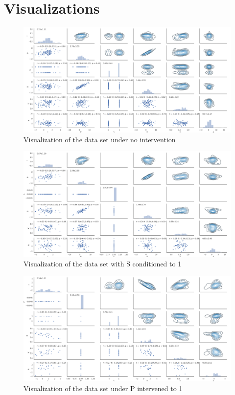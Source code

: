 \documentclass[12pt,fleqn,]{article}
\begin{document}
\section{Visualizations}\label{visuals}
\begin{figure}[H]
	\centering
	\includegraphics[width=\linewidth]{interNonedata}
	\caption{Visualization of the data set under no intervention}
	\label{fig:interNonedata}
\end{figure}
\begin{figure}[H]
	\centering
	\includegraphics[width=\linewidth]{icondSdata}
	\caption{Visualization of the data set with S conditioned to 1}
	\label{fig:icondSdata}
\end{figure}
\begin{figure}[H]
	\centering
	\includegraphics[width=\linewidth]{interPdata}
	\caption{Visualization of the data set under P intervened to 1}
	\label{fig:interPdata}
\end{figure}
\end{document}

